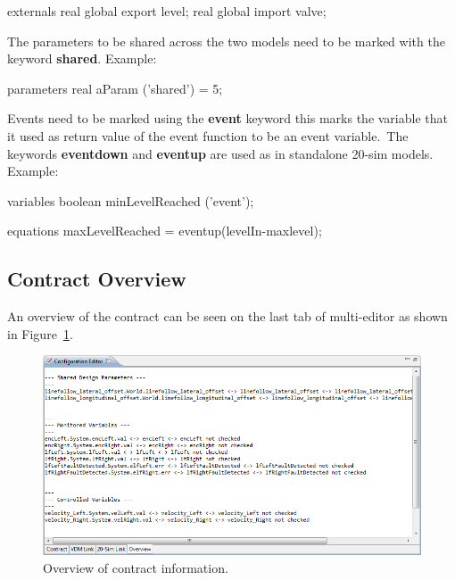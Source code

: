 \documentclass{crescendorepchap}
\newcommand{\vdmkeyw}[1]{{\bf\ttfamily #1}}
\begin{document}
\begin{dcl}
externals
  real global export level;
  real global import valve;
\end{dcl}

\noindent The parameters to be shared across the two models need to be marked with
the keyword \vdmkeyw{shared}. Example:

\begin{dcl}
parameters
  real aParam ('shared') = 5; 
\end{dcl}


Events need to be marked using the \vdmkeyw{event} keyword this marks
the variable that it used as return value of the event function to be an
event variable.~The keywords \vdmkeyw{eventdown} and \vdmkeyw{eventup}
are used as in standalone 20-sim models.  Example:

\begin{dcl}
variables
  boolean minLevelReached ('event');

equations
  maxLevelReached = eventup(levelIn-maxlevel);
\end{dcl}

\subsection{Contract Overview}

An overview of the contract can be seen on the last tab of multi-editor as shown in Figure~\ref{fig:ContractOverview}.

\begin{figure}[htbp]
\centering
\includegraphics[width=.8\textwidth]{images/ContractOverview.png}
\caption{Overview of contract information.\label{fig:ContractOverview}}
\end{figure}
\end{document}
